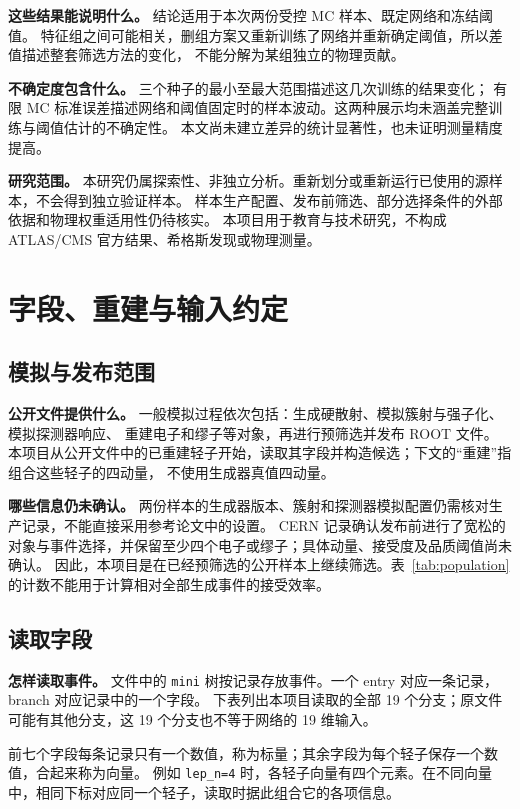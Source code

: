 \documentclass[11pt,a4paper,fontset=fandol,scheme=plain]{ctexart}
\begin{document}
\textbf{这些结果能说明什么。} 结论适用于本次两份受控 MC 样本、既定网络和冻结阈值。
特征组之间可能相关，删组方案又重新训练了网络并重新确定阈值，所以差值描述整套筛选方法的变化，
不能分解为某组独立的物理贡献。

\textbf{不确定度包含什么。} 三个种子的最小至最大范围描述这几次训练的结果变化；
有限 MC 标准误差描述网络和阈值固定时的样本波动。这两种展示均未涵盖完整训练与阈值估计的不确定性。
本文尚未建立差异的统计显著性，也未证明测量精度提高。

\textbf{研究范围。} 本研究仍属探索性、非独立分析。重新划分或重新运行已使用的源样本，不会得到独立验证样本。
样本生产配置、发布前筛选、部分选择条件的外部依据和物理权重适用性仍待核实。
本项目用于教育与技术研究，不构成 ATLAS/CMS 官方结果、希格斯发现或物理测量。

\clearpage
\appendix

\section{字段、重建与输入约定}\label{app:fields}

\subsection{模拟与发布范围}
\textbf{公开文件提供什么。} 一般模拟过程依次包括：生成硬散射、模拟簇射与强子化、模拟探测器响应、
重建电子和缪子等对象，再进行预筛选并发布 ROOT 文件。
本项目从公开文件中的已重建轻子开始，读取其字段并构造候选；下文的“重建”指组合这些轻子的四动量，
不使用生成器真值四动量。

\textbf{哪些信息仍未确认。} 两份样本的生成器版本、簇射和探测器模拟配置仍需核对生产记录，不能直接采用参考论文中的设置。
CERN 记录确认发布前进行了宽松的对象与事件选择，并保留至少四个电子或缪子；具体动量、接受度及品质阈值尚未确认。
因此，本项目是在已经预筛选的公开样本上继续筛选。表~\ref{tab:population} 的计数不能用于计算相对全部生成事件的接受效率。
\subsection{读取字段}
\textbf{怎样读取事件。} 文件中的 \texttt{mini} 树按记录存放事件。一个 entry 对应一条记录，branch 对应记录中的一个字段。
下表列出本项目读取的全部 19 个分支；原文件可能有其他分支，这 19 个分支也不等于网络的 19 维输入。

前七个字段每条记录只有一个数值，称为标量；其余字段为每个轻子保存一个数值，合起来称为向量。
例如 \texttt{lep\_n=4} 时，各轻子向量有四个元素。在不同向量中，相同下标对应同一个轻子，读取时据此组合它的各项信息。
\end{document}
